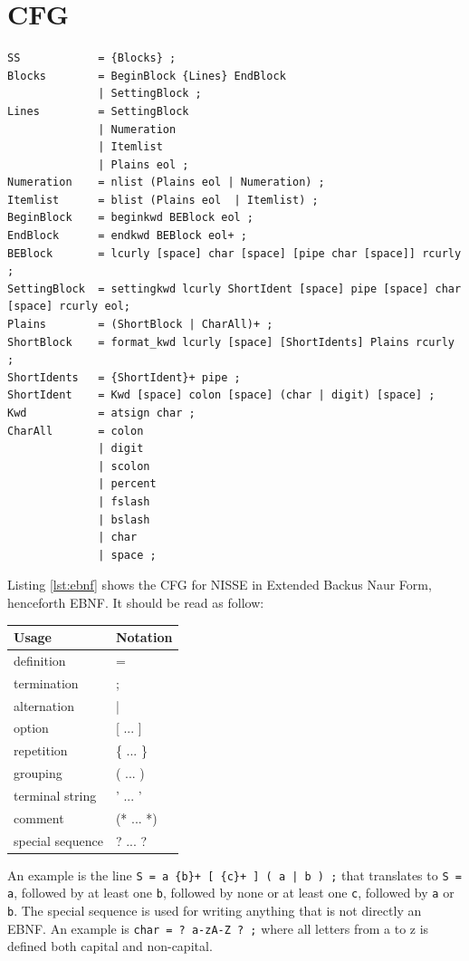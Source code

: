 \section{CFG}
\begin{lstlisting}[frame=single, caption={CFG of NISSE in EBNF.}, label={lst:ebnf}, language=NISSE]
SS            = {Blocks} ;
Blocks        = BeginBlock {Lines} EndBlock 
              | SettingBlock ;
Lines         = SettingBlock 
              | Numeration
              | Itemlist 
              | Plains eol ;
Numeration    = nlist (Plains eol | Numeration) ;
Itemlist      = blist (Plains eol  | Itemlist) ;
BeginBlock    = beginkwd BEBlock eol ;
EndBlock      = endkwd BEBlock eol+ ;
BEBlock       = lcurly [space] char [space] [pipe char [space]] rcurly ;
SettingBlock  = settingkwd lcurly ShortIdent [space] pipe [space] char [space] rcurly eol;
Plains        = (ShortBlock | CharAll)+ ;
ShortBlock    = format_kwd lcurly [space] [ShortIdents] Plains rcurly ;
ShortIdents   = {ShortIdent}+ pipe ;
ShortIdent    = Kwd [space] colon [space] (char | digit) [space] ;
Kwd           = atsign char ;
CharAll       = colon 
              | digit 
              | scolon 
              | percent 
              | fslash 
              | bslash 
              | char 
              | space ;
\end{lstlisting}
Listing \ref{lst:ebnf} shows the CFG for NISSE in Extended Backus Naur Form, henceforth EBNF. It should be read as follow:
\begin{center}
\begin{tabular}{|l|l|}
\hline 
Usage & Notation \\ 
\hline 
definition & = \\ 
\hline 
termination & ; \\ 
\hline 
alternation & | \\ 
\hline 
option & [ ... ] \\ 
\hline 
repetition & \{ ... \} \\ 
\hline 
grouping & ( ... ) \\ 
\hline 
terminal string & ' ... ' \\ 
\hline 
comment & (* ... *) \\ 
\hline 
special sequence & ? ... ? \\ 
\hline 
\end{tabular}
\end{center}
An example is the line \lstinline!S = a {b}+ [ {c}+ ] ( a | b ) ;! that translates to \lstinline!S = a!, followed by at least one \lstinline!b!, followed by none or at least one \lstinline!c!, followed by \lstinline!a! or \lstinline!b!. The special sequence is used for writing anything that is not directly an EBNF. An example is \lstinline!char = ? a-zA-Z ? ;! where all letters from a to z is defined both capital and non-capital.

